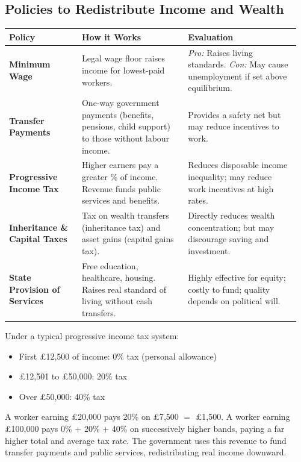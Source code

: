 \documentclass[11pt, a4paper, twoside]{book}
\begin{document}
\subsection{Policies to Redistribute Income and Wealth}

\begin{tcolorbox}[enhanced,colback=LightBlue,colframe=MidBlue!70,arc=0pt,boxrule=0.8pt]
\begin{tabular}{@{}>{\RaggedRight\arraybackslash}p{0.24\linewidth}>{\RaggedRight\arraybackslash}p{0.35\linewidth}>{\RaggedRight\arraybackslash}p{0.37\linewidth}@{}}
\textbf{\color{NavyPrimary}Policy} & \textbf{\color{NavyPrimary}How it Works} & \textbf{\color{NavyPrimary}Evaluation} \\
\midrule
\textbf{Minimum Wage} & Legal wage floor raises income for lowest-paid workers. & \textit{Pro:} Raises living standards. \textit{Con:} May cause unemployment if set above equilibrium. \\
\textbf{Transfer Payments} & One-way government payments (benefits, pensions, child support) to those without labour income. & Provides a safety net but may reduce incentives to work. \\
\textbf{Progressive Income Tax} & Higher earners pay a greater \% of income. Revenue funds public services and benefits. & Reduces disposable income inequality; may reduce work incentives at high rates. \\
\textbf{Inheritance \& Capital Taxes} & Tax on wealth transfers (inheritance tax) and asset gains (capital gains tax). & Directly reduces wealth concentration; but may discourage saving and investment. \\
\textbf{State Provision of Services} & Free education, healthcare, housing. Raises real standard of living without cash transfers. & Highly effective for equity; costly to fund; quality depends on political will. \\
\end{tabular}
\end{tcolorbox}

\begin{example}
Under a typical progressive income tax system:
\begin{itemize}
  \item First \pounds12{,}500 of income: 0\% tax (personal allowance)
  \item \pounds12{,}501 to \pounds50{,}000: 20\% tax
  \item Over \pounds50{,}000: 40\% tax
\end{itemize}
A worker earning \pounds20{,}000 pays 20\% on \pounds7{,}500 $=$ \pounds1{,}500. A worker earning \pounds100{,}000 pays 0\% + 20\% + 40\% on successively higher bands, paying a far higher total and average tax rate. The government uses this revenue to fund transfer payments and public services, redistributing real income downward.
\end{example}
\end{document}
